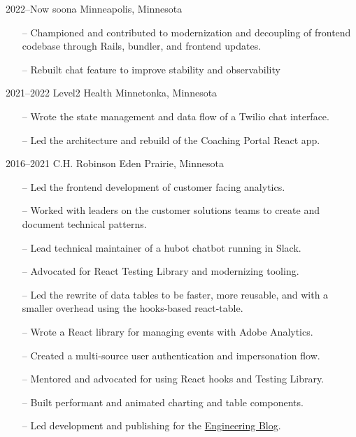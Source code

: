 \documentclass[]{cv-style} %
\begin{document}
\begin{entrylist}


\entry
{2022--Now}
{soona}
{Minneapolis, Minnesota}
{
\begin{itemize}
    \item[--] Championed and contributed to modernization and decoupling of frontend codebase through Rails, bundler, and frontend updates.
    \item[--] Rebuilt chat feature to improve stability and observability
\end{itemize}}

\entry
{2021--2022}
{Level2 Health}
{Minnetonka, Minnesota}
{
\begin{itemize}
    \item[--] Wrote the state management and data flow of a Twilio chat interface.
    \item[--] Led the architecture and rebuild of the Coaching Portal React app.
\end{itemize}}

\entry
{2016--2021}
{C.H. Robinson}
{Eden Prairie, Minnesota}
{

\begin{itemize}
    \item[--] Led the frontend development of customer facing analytics.
    \item[--] Worked with leaders on the customer solutions teams to create and document technical patterns.
    \item[--] Lead technical maintainer of a hubot chatbot running in Slack.
    \item[--] Advocated for React Testing Library and modernizing tooling.
    \item[--] Led the rewrite of data tables to be faster, more reusable, and with a smaller overhead using the hooks-based react-table.
\end{itemize}

\begin{itemize}
    \item[--] Wrote a React library for managing events with Adobe Analytics.
    \item[--] Created a multi-source user authentication and impersonation flow.
    \item[--] Mentored and advocated for using React hooks and Testing Library.
    \item[--] Built performant and animated charting and table components.
    \item[--] Led development and publishing for the \href{https://engineering.chrobinson.com}{Engineering Blog}.
\end{itemize}

}
\end{entrylist}
\end{document}
